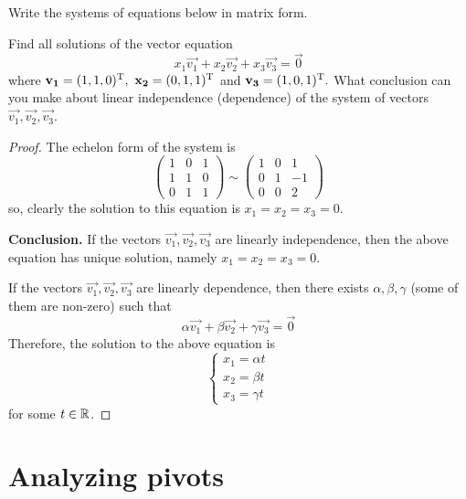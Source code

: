 \begin{exercise}
  Write the systems of equations below in matrix form.
\end{exercise}
\begin{exercise}
  Find all solutions of the vector equation
  \[x_1\vec{v_1}+x_2\vec{v_2}+x_3\vec{v_3}=\vec{0}\]
  where $\mathbf{v_1}=(1,1,0)^\mathrm{T},~\mathbf{x_2}=(0,1,1)^\mathrm{T}$ and 
  $\mathbf{v_3}=(1,0,1)^\mathrm{T}.$ What conclusion can you make about linear
  independence (dependence) of the system of vectors 
  $\vec{v_1},\vec{v_2},\vec{v_3}$.
\end{exercise}
\begin{proof}
  The echelon form of the system is
  \[
    \begin{pmatrix}
      1 &0 &1\\
      1 &1 &0\\
      0 &1 &1
    \end{pmatrix}
    \sim
    \begin{pmatrix}
      1 &0 &1\\
      0 &1 &-1\\
      0 &0 &2
    \end{pmatrix}
  \]
  so, clearly the solution to this equation is
  $x_1=x_2=x_3=0$.

  \textbf{Conclusion.} If the vectors $\vec{v_1},\vec{v_2},\vec{v_3}$
  are linearly independence, then the above equation has unique 
  solution, namely $x_1=x_2=x_3=0$.

  If the vectors $\vec{v_1},\vec{v_2},\vec{v_3}$ are linearly 
  dependence, then there exists $\alpha, \beta,\gamma$ 
  (some of them are non-zero) such that
  \[\alpha\vec{v_1}+\beta\vec{v_2}+\gamma\vec{v_3}=\vec{0}\]
  Therefore, the solution to the above equation is
  \[
    \begin{cases}
      x_1=\alpha t\\
      x_2=\beta t\\
      x_3=\gamma t
    \end{cases}
  \]
  for some $t\in\R$.
\end{proof}

\section{Analyzing pivots}


